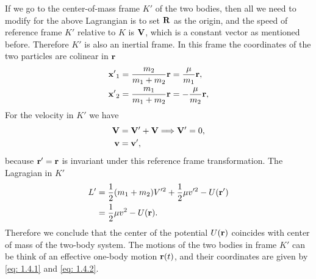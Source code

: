 \documentclass[10pt]{article}
\begin{document}
If we go to the center-of-mass frame $K'$ of the two bodies, then all we need to modify for the above Lagrangian is to set $\vb{R}$ as the origin, and the speed of reference frame $K'$ relative to $K$ is $\vb{V}$, which is a constant vector as mentioned before. Therefore $K'$ is also an inertial frame. In this frame the coordinates of the two particles are colinear in $\vb{r}$
\begin{align}
	\vb{x'}_1 &= \frac{m_2}{m_1 + m_2} \vb{r} = \frac{\mu}{m_1} \vb{r}, \label{eq: 1.4.1}\\
	\vb{x'}_2 &= \frac{m_1}{m_1 + m_2} \vb{r} = - \frac{\mu}{m_2} \vb{r}, \label{eq: 1.4.2}
\end{align}
For the velocity in $K'$ we have
\begin{align}
	\vb{V} &= \vb{V'} + \vb{V} \Longrightarrow \vb{V'} = 0, \\
	\vb{v} &= \vb{v'},
\end{align}
because $\vb{r'} = \vb{r}$ is invariant under this reference frame transformation. The Lagragian in $K'$
\begin{align*}
	L' &= \frac{1}{2}(m_1 + m_2) V'^2 + \frac{1}{2}\mu v'^2 - U(\vb{r'}) \\
	&= \frac{1}{2}\mu v^2 - U(\vb{r}).
\end{align*}
Therefore we conclude that the center of the potential $U(\vb{r})$ coincides with center of mass of the two-body system. The motions of the two bodies in frame $K'$ can be think of an effective one-body motion $\vb{r}(t)$, and their coordinates are given by \eqref{eq: 1.4.1} and  \eqref{eq: 1.4.2}.
\end{document}
